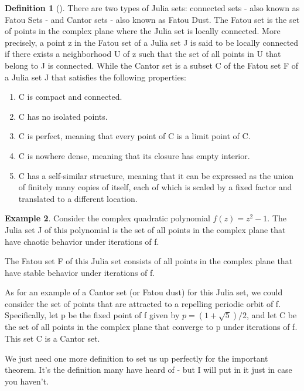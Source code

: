 \documentclass[a4paper,11pt]{article}
\theoremstyle{definition}
\newtheorem{defn}{Definition}[section] %
\newtheorem{exmp}[defn]{Example}
\numberwithin{equation}{section} %
\begin{document}
\begin{defn}[\cite{defn-of-fatou-sets-dust}]
    There are two types of Julia sets: connected sets - also known as Fatou Sets - and Cantor sets - also known as Fatou Dust.
    The Fatou set is the set of points in the complex plane where the Julia set is locally connected. More precisely, a point z in the Fatou set of a Julia set J is said to be locally connected if there exists a neighborhood U of z such that the set of all points in U that belong to J is connected.
    While the Cantor set is a subset C of the Fatou set F of a Julia set J that satisfies the following properties:
    \begin{enumerate}
        \item C is compact and connected.
        \item C has no isolated points.
        \item C is perfect, meaning that every point of C is a limit point of C.
        \item C is nowhere dense, meaning that its closure has empty interior.
        \item C has a self-similar structure, meaning that it can be expressed as the union of finitely many copies of itself, each of which is scaled by a fixed factor and translated to a different location.
    \end{enumerate}

\end{defn}

\begin{exmp}
    Consider the complex quadratic polynomial $f(z) = z^2 - 1$. The Julia set J of this polynomial is the set of all points in the complex plane that have chaotic behavior under iterations of f.

    The Fatou set F of this Julia set consists of all points in the complex plane that have stable behavior under iterations of f.

    As for an example of a Cantor set (or Fatou dust) for this Julia set, we could consider the set of points that are attracted to a repelling periodic orbit of f. Specifically, let p be the fixed point of f given by $p = (1 + \sqrt{5})/2$, and let C be the set of all points in the complex plane that converge to p under iterations of f. This set C is a Cantor set.
\end{exmp}

We just need one more definition to set us up perfectly for the important theorem. It's the definition many have heard of - but I will put in it just in case you haven't.
\end{document}
